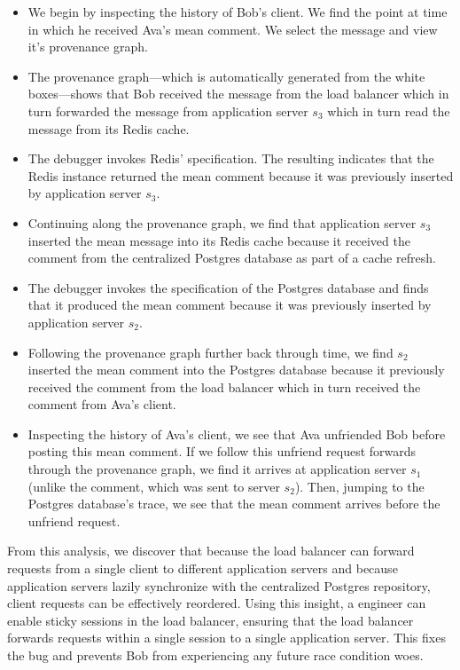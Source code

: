 \begin{itemize}
  \item
    We begin by inspecting the history of Bob's \systemname{} client. We find
    the point at time in which he received Ava's mean comment. We select the
    message and view it's provenance graph.
  \item
    The provenance graph---which is automatically generated from the white
    boxes---shows that Bob received the message from the load balancer which in
    turn forwarded the message from application server $s_3$ which in turn read
    the message from its Redis cache.
  \item
    The \fluent{} debugger invokes Redis' \watprovenance{} specification. The
    resulting \watprovenance{} indicates that the Redis instance returned the
    mean comment because it was previously inserted by application server
    $s_3$.
  \item
    Continuing along the provenance graph, we find that application server
    $s_3$ inserted the mean message into its Redis cache because it received
    the comment from the centralized Postgres database as part of a cache
    refresh.
  \item
    The \fluent{} debugger invokes the \watprovenance{} specification of the
    Postgres database and finds that it produced the mean comment because it
    was previously inserted by application server $s_2$.
  \item
    Following the provenance graph further back through time, we find $s_2$
    inserted the mean comment into the Postgres database because it previously
    received the comment from the load balancer which in turn received the
    comment from Ava's \systemname{} client.
  \item
    Inspecting the history of Ava's \systemname{} client, we see that Ava
    unfriended Bob before posting this mean comment. If we follow this unfriend
    request forwards through the provenance graph, we find it arrives at
    application server $s_1$ (unlike the comment, which was sent to server
    $s_2$). Then, jumping to the Postgres database's trace, we see that the
    mean comment arrives before the unfriend request.
\end{itemize}

From this analysis, we discover that because the load balancer can forward
requests from a single client to different application servers and because
application servers lazily synchronize with the centralized Postgres
repository, client requests can be effectively reordered. Using this insight, a
\systemname{} engineer can enable sticky sessions in the load balancer,
ensuring that the load balancer forwards requests within a single session to a
single application server. This fixes the bug and prevents Bob from
experiencing any future race condition woes.
